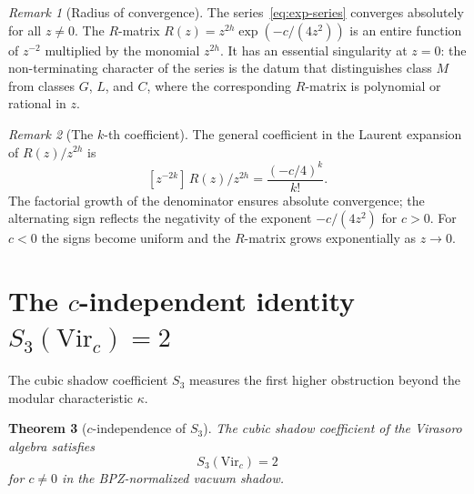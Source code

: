 \documentclass[11pt]{article}
\newtheorem{theorem}{Theorem}[section]
\theoremstyle{definition}
\theoremstyle{remark}
\newtheorem{remark}[theorem]{Remark}
\newcommand{\Vir}{\mathrm{Vir}}
\numberwithin{equation}{section}
\begin{document}
\begin{remark}[Radius of convergence]\label{rem:convergence}
The series~\eqref{eq:exp-series} converges absolutely for all
$z \neq 0$. The $R$-matrix $R(z) = z^{2h}\exp(-c/(4z^2))$ is an
entire function of $z^{-2}$ multiplied by the monomial $z^{2h}$.
It has an essential singularity at $z = 0$: the non-terminating
character of the series is the datum that distinguishes class $M$
from classes $G$, $L$, and $C$, where the corresponding $R$-matrix
is polynomial or rational in $z$.
\end{remark}

\begin{remark}[The $k$-th coefficient]\label{rem:coefficients}
The general coefficient in the Laurent expansion of
$R(z)/z^{2h}$ is
\begin{equation}\label{eq:general-coeff}
[z^{-2k}]\,R(z)/z^{2h} = \frac{(-c/4)^k}{k!}.
\end{equation}
The factorial growth of the denominator ensures absolute
convergence; the alternating sign reflects the negativity of the
exponent $-c/(4z^2)$ for $c > 0$. For $c < 0$ the signs become
uniform and the $R$-matrix grows exponentially as $z \to 0$.
\end{remark}

\section{The $c$-independent identity $S_3(\Vir_c) = 2$}
\label{sec:s3}

The cubic shadow coefficient $S_3$ measures the first higher
obstruction beyond the modular characteristic $\kappa$.

\begin{theorem}[$c$-independence of $S_3$]\label{thm:s3}
The cubic shadow coefficient of the Virasoro algebra satisfies
\begin{equation}\label{eq:s3}
S_3(\Vir_c) = 2
\end{equation}
for $c\neq0$ in the BPZ-normalized vacuum shadow.
\end{theorem}
\end{document}
